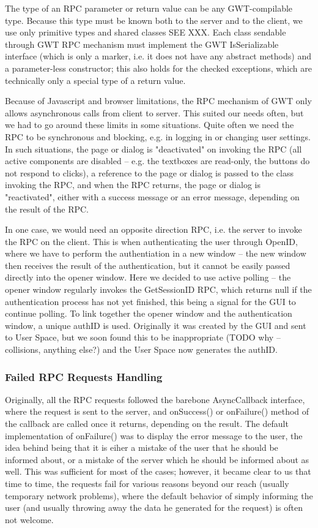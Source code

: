 The type of an RPC parameter or return value can be any GWT-compilable type. Because this type must be known both to the server and to the client, we use only primitive types and shared classes SEE XXX. Each class sendable through GWT RPC mechanism must implement the GWT IsSerializable interface (which is only a marker, i.e. it does not have any abstract methods) and a parameter-less constructor; this also holds for the checked exceptions, which are technically only a special type of a return value.

Because of Javascript and browser limitations, the RPC mechanism of GWT only allows asynchronous calls from client to server. This suited our needs often, but we had to go around these limits in some situations. Quite often we need the RPC to be synchronous and blocking, e.g. in logging in or changing user settings. In such situations, the page or dialog is "deactivated" on invoking the RPC (all active components are disabled -- e.g. the textboxes are read-only, the buttons do not respond to clicks), a reference to the page or dialog is passed to the class invoking the RPC, and when the RPC returns, the page or dialog is "reactivated", either with a success message or an error message, depending on the result of the RPC.

In one case, we would need an opposite direction RPC, i.e. the server to invoke the RPC on the client. This is when authenticating the user through OpenID, where we have to perform the authentiation in a new window -- the new window then receives the result of the authentication, but it cannot be easily passed directly into the opener window. Here we decided to use active polling -- the opener window regularly invokes the GetSessionID RPC, which returns null if the authentication process has not yet finished, this being a signal for the GUI to continue polling. To link together the opener window and the authentication window, a unique authID is used. Originally it was created by the GUI and sent to User Space, but we soon found this to be inappropriate (TODO why -- collisions, anything else?) and the User Space now generates the authID.

\subsubsection{Failed RPC Requests Handling}

Originally, all the RPC requests followed the barebone AsyncCallback interface, where the request is sent to the server, and onSuccess() or onFailure() method of the callback are called once it returns, depending on the result. The default implementation of onFailure() was to display the error message to the user, the idea behind being that it is eiher a mistake of the user that he should be informed about, or a mistake of the server which he should be informed about as well. This was sufficient for most of the cases; however, it became clear to us that time to time, the requests fail for various reasons beyond our reach (usually temporary network problems), where the default behavior of simply informing the user (and usually throwing away the data he generated for the request) is often not welcome.

